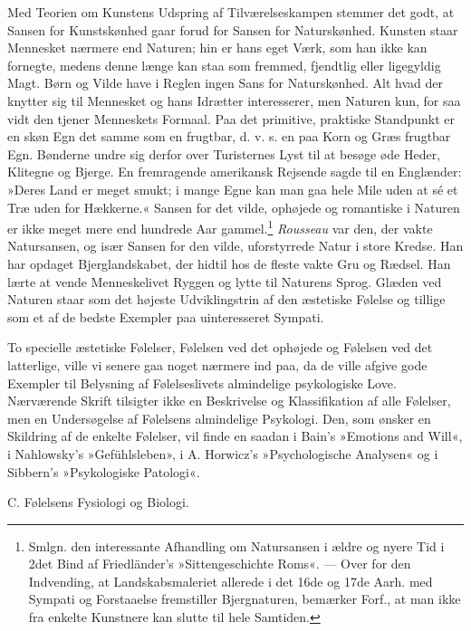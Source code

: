 \documentclass[12pt,a4paper,openany]{book}
\newcommand{\opage}[1]{\marginnote{\footnotesize\textit{[#1]}}}
\begin{document}
Med Teorien om Kunstens Udspring af Tilværelseskampen stemmer det godt,
at Sansen for Kunstskønhed gaar forud for Sansen for Naturskønhed.
Kunsten staar Mennesket nærmere end Naturen; hin er hans eget Værk, som
han ikke kan fornegte, medens denne længe kan staa som fremmed,
fjendtlig eller ligegyldig Magt. Børn og Vilde have i Reglen ingen Sans
for Naturskønhed. Alt hvad der knytter sig til Mennesket og hans
Idrætter interesserer, men Naturen kun, for saa vidt den tjener
Menneskets Formaal. Paa det primitive, praktiske Standpunkt er en skøn
Egn det samme som en frugtbar, d. v. s. en paa Korn og Græs frugtbar
Egn. Bønderne undre sig derfor over Turisternes Lyst til at besøge øde
Heder, Klitegne og Bjerge. En fremragende amerikansk Rejsende sagde til
en Englænder: »Deres Land er meget smukt; i mange Egne kan man gaa hele
Mile uden at sé et Træ uden for Hækkerne.« Sansen for det vilde,
ophøjede og romantiske i Naturen er ikke meget mere end hundrede Aar
gammel.\footnote[1]{Smlgn. den interessante Afhandling om Natursansen i
ældre og nyere Tid i 2det Bind af Friedländer’s »Sittengeschichte Roms«.
--- Over for den Indvending, at Landskabsmaleriet allerede i det 16de og
17de Aarh. med Sympati og Forstaaelse fremstiller Bjergnaturen, bemærker
Forf., at man ikke fra enkelte Kunstnere kan slutte til hele Samtiden.}
\emph{Rousseau}
\opage{318}var den, der vakte Natursansen, og især Sansen for den vilde,
uforstyrrede Natur i store Kredse. Han har opdaget Bjerglandskabet, der
hidtil hos de fleste vakte Gru og Rædsel. Han lærte at vende
Menneskelivet Ryggen og lytte til Naturens Sprog. Glæden ved Naturen
staar som det højeste Udviklingstrin af den æstetiske Følelse og tillige
som et af de bedste Exempler paa uinteresseret Sympati.

To specielle æstetiske Følelser, Følelsen ved det ophøjede og Følelsen
ved det latterlige, ville vi senere gaa noget nærmere ind paa, da de
ville afgive gode Exempler til Belysning af Følelseslivets almindelige
psykologiske Love. Nærværende Skrift tilsigter ikke en Beskrivelse og
Klassifikation af alle Følelser, men en Undersøgelse af Følelsens
almindelige Psykologi. Den, som ønsker en Skildring af de enkelte
Følelser, vil finde en saadan i Bain’s »Emotions and Will«, i
Nahlowsky’s »Gefühlsleben», i A. Horwicz’s »Psychologische Analysen« og
i Sibbern’s »Psykologiske Patologi«.

\begin{center}C. Følelsens Fysiologi og Biologi.\end{center}
\end{document}
